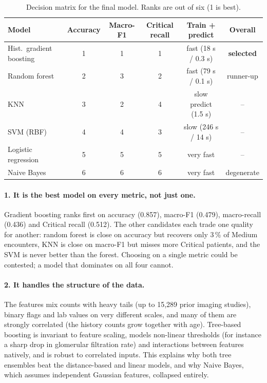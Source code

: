 \documentclass[11pt,a4paper]{article}
\newcommand{\best}[1]{\textbf{\textcolor{accent}{#1}}}
\begin{document}
\begin{table}[H]
\centering\small
\caption{Decision matrix for the final model. Ranks are out of six (1 is best).}
\label{tab:choice}
\begin{tabular}{@{}lccccc@{}}
\toprule
\textbf{Model} & \textbf{Accuracy} & \textbf{Macro-F1} & \textbf{Critical recall} & \textbf{Train + predict} & \textbf{Overall} \\
\midrule
Hist.\ gradient boosting & 1 & 1 & 1 & fast (18 s / 0.3 s) & \best{selected} \\
Random forest            & 2 & 3 & 2 & fast (79 s / 0.1 s) & runner-up \\
KNN                      & 3 & 2 & 4 & slow predict (1.5 s) & -- \\
SVM (RBF)                & 4 & 4 & 3 & slow (246 s / 14 s) & -- \\
Logistic regression      & 5 & 5 & 5 & very fast & -- \\
Naive Bayes              & 6 & 6 & 6 & very fast & degenerate \\
\bottomrule
\end{tabular}
\end{table}

\paragraph{1. It is the best model on every metric, not just one.}
Gradient boosting ranks first on accuracy (0.857), macro-F1 (0.479), macro-recall (0.436) and
Critical recall (0.512). The other candidates each trade one quality for another: random forest is
close on accuracy but recovers only 3\,\% of Medium encounters, KNN is close on macro-F1 but misses
more Critical patients, and the SVM is never better than the forest. Choosing on a single metric
could be contested; a model that dominates on all four cannot.

\paragraph{2. It handles the structure of the data.}
The features mix counts with heavy tails (up to 15{,}289 prior imaging studies), binary flags and
lab values on very different scales, and many of them are strongly correlated (the history counts
grow together with age). Tree-based boosting is invariant to feature scaling, models non-linear
thresholds (for instance a sharp drop in glomerular filtration rate) and interactions between
features natively, and is robust to correlated inputs. This explains why both tree ensembles beat
the distance-based and linear models, and why Naive Bayes, which assumes independent Gaussian
features, collapsed entirely.
\end{document}
